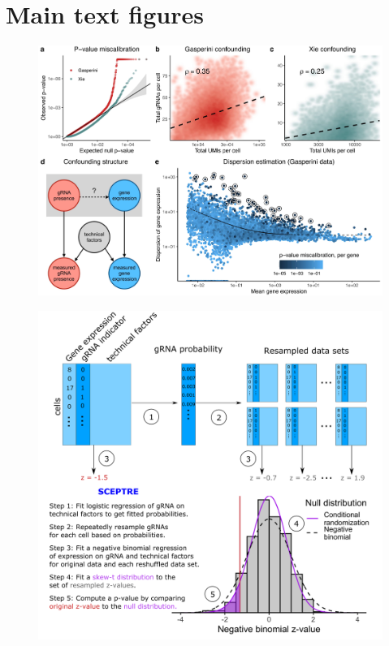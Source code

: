 \documentclass{article}
\begin{document}
\section*{Main text figures}
\begin{figure}[h]
\includegraphics[width = \textwidth]{Figure1.jpg}
\caption{}
\label{fig:analysis-challenges}
\end{figure}
\clearpage
\begin{figure}[h]
	\includegraphics[width = \textwidth]{Figure2.png}
	\caption{}
	\label{fig:method}
\end{figure}
\end{document}
